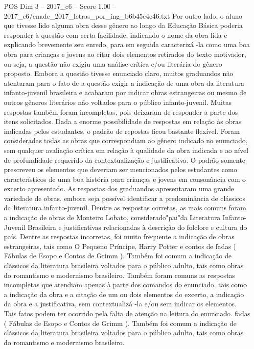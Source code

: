 \begin{textsample}{POS Dim 3 – 2017\_c6 – Score 1.00 – 2017\_c6/enade\_2017\_letras\_por\_ing\_b6b45c4c46.txt}
Por outro lado, o aluno que tivesse lido alguma obra desse gênero ao longo da Educação Básica poderia responder à questão com certa facilidade, indicando o nome da obra lida e explicando brevemente seu enredo, para em seguida caracterizá -la como uma boa obra para crianças e jovens ao citar dois elementos retirados do texto motivador, ou seja, a questão não exigiu uma análise crítica e/ou literária do gênero proposto.
Embora a questão tivesse enunciado claro, muitos graduandos não atentaram para o fato de a questão exigir a indicação de uma obra da literatura infanto-juvenil brasileira e acabaram por indicar obras estrangeiras ou mesmo de outros gêneros literários não voltados para o público infanto-juvenil.
Muitas respostas também foram incompletas, pois deixaram de responder a parte dos itens solicitados.
Dada a enorme possibilidade de respostas em relação às obras indicadas pelos estudantes, o padrão de repostas ficou bastante flexível.
Foram consideradas todas as obras que correspondiam ao gênero indicado no enunciado, sem qualquer avaliação crítica em relação à qualidade da obra indicada e ao nível de profundidade requerido da contextualização e justificativa.
O padrão somente prescreveu os elementos que deveriam ser mencionados pelos estudantes como característicos de uma boa história para crianças e jovens em consonância com o excerto apresentado.
As respostas dos graduandos apresentaram uma grande variedade de obras, embora seja possível identificar a predominância de clássicos da literatura infanto-juvenil.
Dentre as respostas corretas, as mais comuns foram a indicação de obras de Monteiro Lobato, considerado"pai"da Literatura Infanto-Juvenil Brasileira e justificativas relacionadas à descrição do folclore e cultura do país.
Dentre as respostas incorretas, foi muito frequente a indicação de obras estrangeiras, tais como O Pequeno Príncipe, Harry Potter e contos de fadas ( Fábulas de Esopo e Contos de Grimm ).
Também foi comum a indicação de clássicos da literatura brasileira voltados para o público adulto, tais como obras do romantismo e modernismo brasileiro.
Também foram comuns as respostas incompletas que atendiam apenas à parte dos comandos do enunciado, tais como a indicação da obra e a citação de um ou dois elementos do excerto, a indicação da obra e a justificativa, sem contextualizá -la e/ou sem indicar os elementos.
Tais fatos podem ter ocorrido pela falta de atenção na leitura do enunciado. fadas ( Fábulas de Esopo e Contos de Grimm ).
Também foi comum a indicação de clássicos da literatura brasileira voltados para o público adulto, tais como obras do romantismo e modernismo brasileiro.

\end{textsample}
